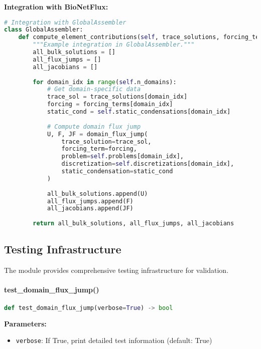 \textbf{Integration with BioNetFlux:}
\begin{lstlisting}[language=Python, caption=BioNetFlux Integration Example]
# Integration with GlobalAssembler
class GlobalAssembler:
    def compute_element_contributions(self, trace_solutions, forcing_terms):
        """Example integration in GlobalAssembler."""
        all_bulk_solutions = []
        all_flux_jumps = []
        all_jacobians = []
        
        for domain_idx in range(self.n_domains):
            # Get domain-specific data
            trace_sol = trace_solutions[domain_idx]
            forcing = forcing_terms[domain_idx]
            static_cond = self.static_condensations[domain_idx]
            
            # Compute domain flux jump
            U, F, JF = domain_flux_jump(
                trace_solution=trace_sol,
                forcing_term=forcing,
                problem=self.problems[domain_idx],
                discretization=self.discretizations[domain_idx],
                static_condensation=static_cond
            )
            
            all_bulk_solutions.append(U)
            all_flux_jumps.append(F)
            all_jacobians.append(JF)
        
        return all_bulk_solutions, all_flux_jumps, all_jacobians
\end{lstlisting}

\subsection{Testing Infrastructure}
\label{subsec:flux_jump_testing}

The module provides comprehensive testing infrastructure for validation.

\paragraph{test\_domain\_flux\_jump()}
\begin{lstlisting}[language=Python, caption=Test Function]
def test_domain_flux_jump(verbose=True) -> bool
\end{lstlisting}

\textbf{Parameters:}
\begin{itemize}
    \item \texttt{verbose}: If True, print detailed test information (default: True)
\end{itemize}

